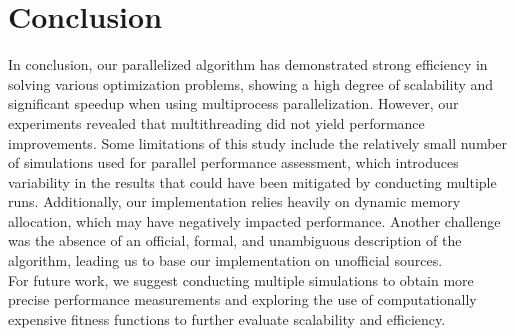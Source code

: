 \documentclass[a4paper,12pt]{article}  %
\begin{document}






\section{Conclusion}
In conclusion, our parallelized algorithm has demonstrated strong efficiency in solving various optimization problems, showing a high degree of scalability and significant speedup when using multiprocess parallelization. However, our experiments revealed that multithreading did not yield performance improvements.
\newline
\newline
Some limitations of this study include the relatively small number of simulations used for parallel performance assessment, which introduces variability in the results that could have been mitigated by conducting multiple runs. Additionally, our implementation relies heavily on dynamic memory allocation, which may have negatively impacted performance. Another challenge was the absence of an official, formal, and unambiguous description of the algorithm, leading us to base our implementation on unofficial sources. 
\newline
\\
For future work, we suggest conducting multiple simulations to obtain more precise performance measurements and exploring the use of computationally expensive fitness functions to further evaluate scalability and efficiency.

\printbibliography    %

\end{document}
